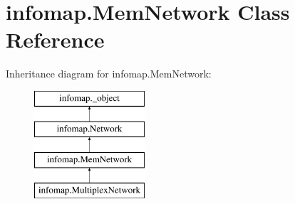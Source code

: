 \hypertarget{classinfomap_1_1MemNetwork}{}\section{infomap.\+Mem\+Network Class Reference}
\label{classinfomap_1_1MemNetwork}
Inheritance diagram for infomap.\+Mem\+Network\+:\begin{figure}[H]
\begin{center}
\leavevmode
\includegraphics[height=4.000000cm]{classinfomap_1_1MemNetwork}
\end{center}
\end{figure}
